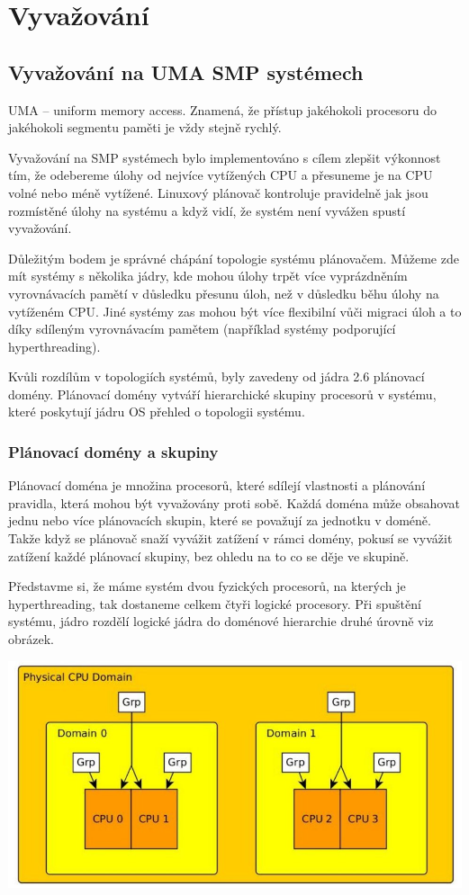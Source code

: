 \documentclass[a4paper,12pt]{article}
\begin{document}
\section{Vyvažování}

\subsection{Vyvažování na UMA SMP systémech}

UMA – uniform memory access. Znamená, že přístup jakéhokoli procesoru do jakéhokoli segmentu paměti je vždy stejně rychlý.

Vyvažování na SMP systémech bylo implementováno s cílem zlepšit výkonnost tím, že odebereme úlohy od nejvíce vytížených CPU a přesuneme je na CPU volné nebo méně vytížené. Linuxový plánovač kontroluje pravidelně jak jsou rozmístěné úlohy na systému a když vidí, že systém není vyvážen spustí vyvažování.

Důležitým bodem je správné chápání topologie systému plánovačem. Můžeme zde mít systémy s několika jádry, kde mohou úlohy trpět více vyprázdněním vyrovnávacích pamětí v důsledku přesunu úloh, než v důsledku běhu úlohy na vytíženém CPU. Jiné systémy zas mohou být více flexibilní vůči migraci úloh a to díky sdíleným vyrovnávacím pamětem (například systémy podporující hyperthreading). 

Kvůli rozdílům v topologiích systémů, byly zavedeny od jádra 2.6 plánovací domény. Plánovací domény vytváří hierarchické skupiny procesorů v systému, které poskytují jádru OS přehled o topologii systému.

\subsubsection{Plánovací domény a skupiny}

Plánovací doména je množina procesorů, které sdílejí vlastnosti a plánování pravidla, která mohou být vyvažovány proti sobě. Každá doména může obsahovat jednu nebo více plánovacích skupin, které se považují za jednotku v doméně. Takže když se plánovač snaží vyvážit zatížení v rámci domény, pokusí se vyvážit zatížení každé plánovací skupiny, bez ohledu na to co se děje ve skupině.

Představme si, že máme systém dvou fyzických procesorů, na kterých je hyperthreading, tak dostaneme celkem čtyři logické procesory. Při spuštění systému, jádro rozdělí logické jádra do doménové hierarchie druhé úrovně viz obrázek.

\includegraphics[scale=0.5]{obrazky/domenyAskupiny.jpeg}
\end{document}
